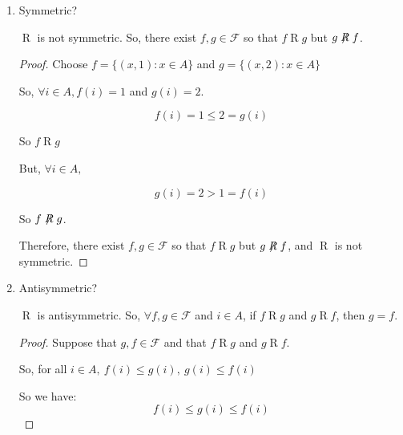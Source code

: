 \documentclass[]{article}
\begin{document}
\begin{enumerate}
\begin{enumerate}[label= (\alph*)]
\begin{enumerate}[label=(\roman*)]
                $\mathrel{R}$ is reflexive.
                \begin{proof}
                    Suppose $f\in\mathcal{F}$.

                    Notice that $\forall i\in A, \: f(i)=f(i)$ since $f$ is a function.

                    So $f(i)\leq f(i)$.

                    So $f\mathrel{R}f$ and $\mathrel{R}$ is reflexive.
                \end{proof}
                \item Symmetric?
                
                $\mathrel{R}$ is not symmetric. So, there exist $f,g\in\mathcal{F}$ so that
                $f\mathrel{R}g$ but $g\not\mathrel{R}f$.

                \begin{proof}
                    Choose $f=\{(x,1):x\in A\}$ and $g=\{(x,2):x\in A\}$

                    So, $\forall i\in A, f(i)=1$ and $g(i)=2$.

                    \[f(i)=1\leq2=g(i)\]

                    So $f\mathrel{R}g$

                    But, $\forall i\in A, $
                
                    \[g(i)=2>1=f(i)\]

                    So $f\not\mathrel{R}g$.

                    Therefore, there exist $f,g\in\mathcal{F}$ so that
                $f\mathrel{R}g$ but $g\not\mathrel{R}f$, and $\mathrel{R}$ is not symmetric.

                \end{proof}

                \item Antisymmetric?

                $\mathrel{R}$ is antisymmetric. So, $\forall f,g\in\mathcal{F}$ and $i\in A$,
                if $f\mathrel{R}g$ and $g\mathrel{R}f$, then $g=f$.

                \begin{proof}
                    Suppose that $g,f\in\mathcal{F}$ and that $f\mathrel{R}g$ and $g\mathrel{R}f$.

                    So, for all $i\in A,\: f(i)\leq g(i), \: g(i)\leq f(i)$

                    So we have: 
                    \[f(i)\leq g(i)\leq f(i)\]


\end{proof}
\end{enumerate}
\end{enumerate}
\end{enumerate}
\end{document}
